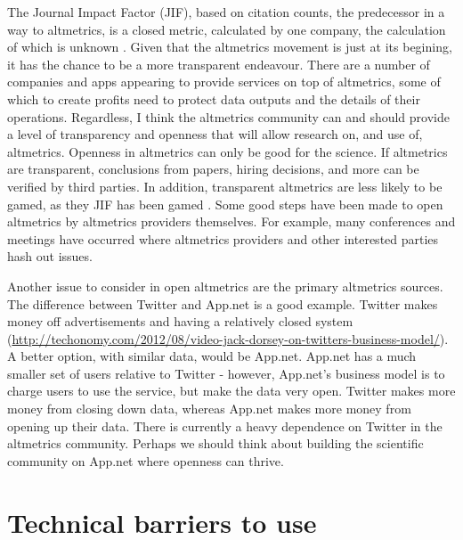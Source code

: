 \documentclass[letterpaper,superscriptaddress,showkeys,longbibliography]{revtex4-1}\usepackage{graphicx, color}
\begin{document}
The Journal Impact Factor (JIF), based on citation counts, the predecessor in a way to altmetrics, is a closed metric, calculated by one company, the calculation of which is unknown \cite{rossner2007show}. Given that the altmetrics movement is just at its begining, it has the chance to be a more transparent endeavour. There are a number of companies and apps appearing to provide services on top of altmetrics, some of which to create profits need to protect data outputs and the details of their operations.  Regardless, I think the altmetrics community can and should provide a level of transparency and openness that will allow research on, and use of, altmetrics. Openness in altmetrics can only be good for the science. If altmetrics are transparent, conclusions from papers, hiring decisions, and more can be verified by third parties. In addition, transparent altmetrics are less likely to be gamed, as they JIF has been gamed \cite{arnold2011}. Some good steps have been made to open altmetrics by altmetrics providers themselves. For example, many conferences and meetings have occurred where altmetrics providers and other interested parties hash out issues. 

Another issue to consider in open altmetrics are the primary altmetrics sources. The difference between Twitter and App.net is a good example. Twitter makes money off advertisements and having a relatively closed system (\url{http://techonomy.com/2012/08/video-jack-dorsey-on-twitters-business-model/}). A better option, with similar data, would be App.net. App.net has a much smaller set of users relative to Twitter - however, App.net's business model is to charge users to use the service, but make the data very open. Twitter makes more money from closing down data, whereas App.net makes more money from opening up their data. There is currently a heavy dependence on Twitter in the altmetrics community. Perhaps we should think about building the scientific community on App.net where openness can thrive. 

\section*{Technical barriers to use}
\end{document}
